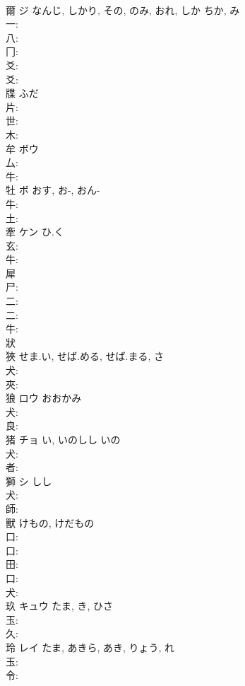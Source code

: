 \documentclass[8pt]{extreport}
\begin{document}
\begin{CJK}{UTF8}{min}
\\	爾	ジ	なんじ, しかり, その, のみ, おれ, しか	ちか, み	
\\	一: 
\\	八: 
\\	冂: 
\\	爻: 
\\	爻: 
\\	牒		ふだ			
\\	片: 
\\	世: 
\\	木: 
\\	牟	ボウ			
\\	厶: 
\\	牛: 
\\	牡	ボ	おす, お-, おん-		
\\	牛: 
\\	土: 
\\	牽	ケン	ひ.く		
\\	玄: 
\\	牛: 
\\	犀					
\\	尸: 
\\	二: 
\\	二: 
\\	牛: 
\\	狀						
\\	狹		せま.い, せば.める, せば.まる, さ				
\\	犬: 
\\	夾: 
\\	狼	ロウ	おおかみ		
\\	犬: 
\\	良: 
\\	猪	チョ	い, いのしし	いの	
\\	犬: 
\\	者: 
\\	獅	シ	しし		
\\	犬: 
\\	師: 
\\	獸		けもの, けだもの				
\\	口: 
\\	口: 
\\	田: 
\\	口: 
\\	犬: 
\\	玖	キュウ		たま, き, ひさ	
\\	玉: 
\\	久: 
\\	玲	レイ		たま, あきら, あき, りょう, れ	
\\	玉: 
\\	令: 

\end{CJK}
\end{document}
